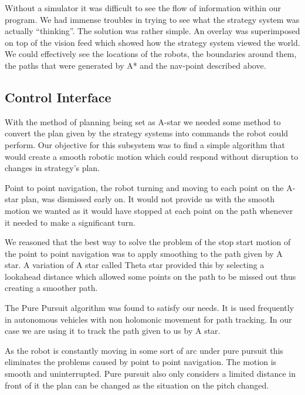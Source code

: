 
Without a simulator it was difficult to see the flow of information within our program. We had immense troubles in trying to see what the strategy system was actually “thinking”. The solution was rather simple. An overlay was superimposed on top of the vision feed which showed how the strategy system viewed the world. We could effectively see the locations of the robots, the boundaries around them, the paths that were generated by A* and the nav-point described above. 


\subsection{Control Interface}

With the method of planning being set as A-star we needed some method to
convert the plan given by the strategy systems into commands the robot could
perform. Our objective for this subsystem was to find a simple algorithm that
would create a smooth robotic motion which could respond without disruption to
changes in strategy's plan.

Point to point navigation, the robot turning and moving to each point on the
A-star plan, was dismissed early on. It would not provide us with the smooth
motion we wanted as it would have stopped at each point on the path whenever it
needed to make a significant turn.

We reasoned that the best way to solve the problem of the stop start motion of
the point to point navigation was to apply smoothing to the path given by
A star. A variation of A star called Theta star provided this by selecting
a lookahead distance which allowed some points on the path to be missed out
thus creating a smoother path.

The Pure Pursuit algorithm was found to satisfy our needs. It is used
frequently in autonomous vehicles with non holomonic
movement for path tracking\cite{agvpp}\cite{coulterpp}. In our case we are
using it to track the path given to us by A star.

As the robot is constantly moving in some sort of arc under pure pursuit this
eliminates the problems caused by point to point navigation. The motion is
smooth and uninterrupted. Pure pursuit also only considers a limited distance
in front of it the plan can be changed as the situation on the pitch changed.

